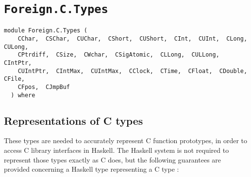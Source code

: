 \chapter{\texttt{Foreign.C.Types}}
\label{module:Foreign.C.Types}
\haddockbeginheader
{\haddockverb\begin{verbatim}
module Foreign.C.Types (
    CChar,  CSChar,  CUChar,  CShort,  CUShort,  CInt,  CUInt,  CLong,  CULong, 
    CPtrdiff,  CSize,  CWchar,  CSigAtomic,  CLLong,  CULLong,  CIntPtr, 
    CUIntPtr,  CIntMax,  CUIntMax,  CClock,  CTime,  CFloat,  CDouble,  CFile, 
    CFpos,  CJmpBuf
  ) where\end{verbatim}}
\haddockendheader

\section{Representations of C types
}
These types are needed to accurately represent C function prototypes,
in order to access C library interfaces in Haskell.  The Haskell system
is not required to represent those types exactly as C does, but the
following guarantees are provided concerning a Haskell type 
representing a C type :
\par
